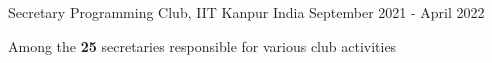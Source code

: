 \cventry
{Secretary} %
{Programming Club, IIT Kanpur} %
{India} %
{September 2021 - April 2022} %
{

  Among the \textbf{25} secretaries responsible for various club activities
}

\vspace{-4mm}
